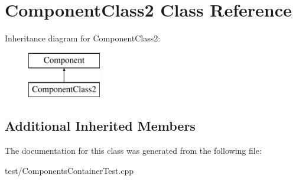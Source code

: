 \hypertarget{classComponentClass2}{}\section{Component\+Class2 Class Reference}
\label{classComponentClass2}
Inheritance diagram for Component\+Class2\+:\begin{figure}[H]
\begin{center}
\leavevmode
\includegraphics[height=2.000000cm]{classComponentClass2}
\end{center}
\end{figure}
\subsection*{Additional Inherited Members}


The documentation for this class was generated from the following file\+:\begin{DoxyCompactItemize}
\item 
test/Components\+Container\+Test.\+cpp\end{DoxyCompactItemize}
